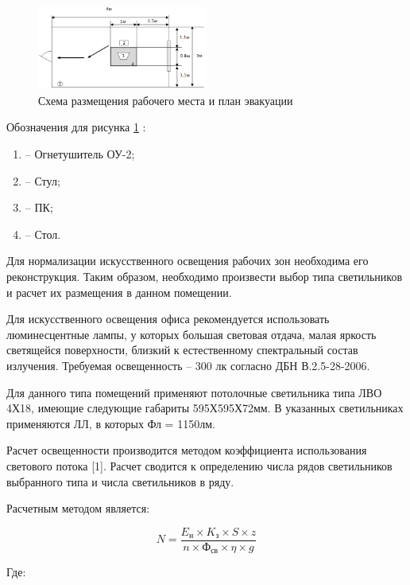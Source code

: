 \begin{figure}[!ht]
    \centering
    \includegraphics[width=0.5\textwidth]{graphics/workplace.png}
    \caption{Схема размещения рабочего места и план эвакуации}
    \label{fig:workplace}
\end{figure}

Обозначения для рисунка \ref{fig:workplace} :

\begin{enumerate}
    \item -- Огнетушитель ОУ-2;
    \item -- Стул;
    \item -- ПК;
    \item -- Стол.
\end{enumerate}

Для нормализации искусственного освещения рабочих зон необходима его реконструкция. Таким образом,
необходимо произвести выбор типа светильников и расчет их размещения в данном помещении.

Для искусственного освещения офиса рекомендуется использовать люминесцентные лампы, у которых большая световая отдача,
малая яркость светящейся поверхности, близкий к естественному спектральный состав излучения. Требуемая освещенность --
300 лк согласно ДБН В.2.5-28-2006.

Для данного типа помещений применяют потолочные светильника типа ЛВО 4Х18, имеющие следующие габариты 595Х595Х72мм.
В указанных светильниках применяются ЛЛ, в которых Фл = 1150лм.

Расчет освещенности производится методом коэффициента использования светового потока [1].
Расчет сводится к определению числа рядов светильников выбранного типа и числа светильников в ряду.

Расчетным методом является:

\[
    N = \dfrac{E_{\text{н}} \times K_{\text{з}} \times S \times z}{n \times \text{Ф}_{\text{св}} \times \eta \times g}
\]

Где: 

